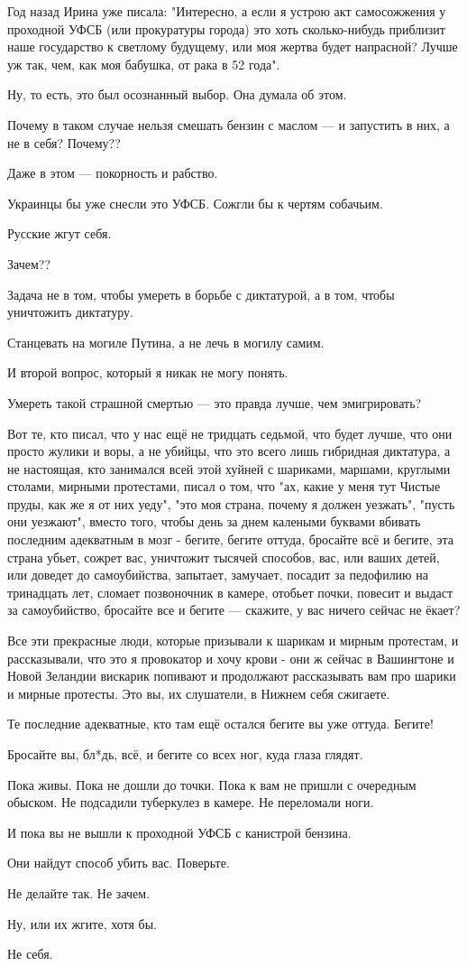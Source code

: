 Год назад Ирина уже писала: "Интересно, а если я устрою акт самосожжения у
проходной УФСБ (или прокуратуры города) это хоть сколько-нибудь приблизит наше
государство к светлому будущему, или моя жертва будет напрасной? Лучше уж так,
чем, как моя бабушка, от рака в 52 года".

Ну, то есть, это был осознанный выбор. Она думала об этом.

Почему в таком случае нельзя смешать бензин с маслом --- и запустить в них, а не
в себя? Почему??

Даже в этом --- покорность и рабство.

Украинцы бы уже снесли это УФСБ. Сожгли бы к чертям собачьим.

Русские жгут себя.

Зачем??

Задача не в том, чтобы умереть в борьбе с диктатурой, а в том, чтобы уничтожить
диктатуру.

Станцевать на могиле Путина, а не лечь в могилу самим.

И второй вопрос, который я никак не могу понять.

Умереть такой страшной смертью --- это правда лучше, чем эмигрировать?

Вот те, кто писал, что у нас ещё не тридцать седьмой, что будет лучше, что они
просто жулики и воры, а не убийцы, что это всего лишь гибридная диктатура, а не
настоящая, кто занимался всей этой хуйней с шариками, маршами, круглыми
столами, мирными протестами, писал о том, что "ах, какие у меня тут Чистые
пруды, как же я от них уеду", "это моя страна, почему я должен уезжать", "пусть
они уезжают", вместо того, чтобы день за днем калеными буквами вбивать
последним адекватным в мозг - бегите, бегите оттуда, бросайте всё и бегите, эта
страна убьет, сожрет вас, уничтожит тысячей способов, вас, или ваших детей, или
доведет до самоубийства, запытает, замучает, посадит за педофилию на тринадцать
лет, сломает позвоночник в камере, отобьет почки, повесит и выдаст за
самоубийство, бросайте все и бегите --- скажите, у вас ничего сейчас не ёкает?

Все эти прекрасные люди, которые призывали к шарикам и мирным протестам, и
рассказывали, что это я провокатор и хочу крови - они ж сейчас в Вашингтоне и
Новой Зеландии вискарик попивают и продолжают рассказывать вам про шарики и
мирные протесты. Это вы, их слушатели, в Нижнем себя сжигаете.

Те последние адекватные, кто там ещё остался бегите вы уже оттуда. Бегите!

Бросайте вы, бл*дь, всё, и бегите со всех ног, куда глаза глядят.

Пока живы. Пока не дошли до точки. Пока к вам не пришли с очередным обыском. Не
подсадили туберкулез в камере. Не переломали ноги.

И пока вы не вышли к проходной УФСБ с канистрой бензина.

Они найдут способ убить вас. Поверьте.

Не делайте так. Не зачем.

Ну, или их жгите, хотя бы.

Не себя.
